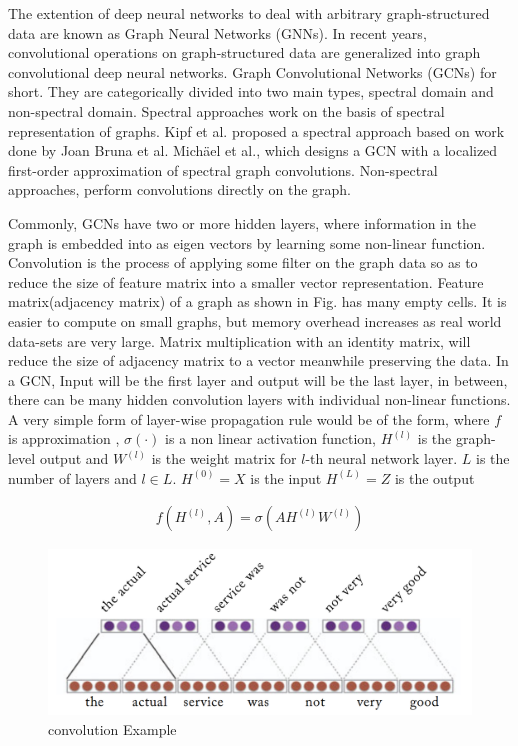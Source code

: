 The extention of deep neural networks to deal with arbitrary graph-structured data are known as Graph Neural Networks (GNNs)\cite{gori2005new,scarselli2008graph}. In recent years, convolutional operations on graph-structured data are generalized into graph convolutional deep neural networks. Graph Convolutional Networks (GCNs) for short\cite{kipf2016semi}. They are categorically divided into two main types, spectral domain and non-spectral domain. Spectral approaches work on the basis of spectral representation of graphs. Kipf et al.\cite{kipf2016semi} proposed a spectral approach based on work done by Joan Bruna et al.\cite{bruna2013spectral} Michäel et al.\cite{defferrard2016convolutional}, which designs a GCN with a localized first-order approximation of spectral graph convolutions. Non-spectral approaches, perform  convolutions directly on the graph.

\newpar
Commonly, GCNs have two or more hidden layers, where information in the graph is embedded into as eigen vectors by learning some non-linear function. Convolution is the process of applying some filter on the graph data so as to reduce the size of feature matrix into a smaller vector representation. Feature matrix(adjacency matrix) of a graph as shown in Fig. has many empty cells. It is easier to compute on small graphs, but memory overhead increases as real world data-sets are very large. Matrix multiplication with an identity matrix, will reduce the size of adjacency matrix to a vector meanwhile preserving the data. In a GCN, Input will be the first layer and output will be the last layer, in between, there can be many hidden convolution layers with individual non-linear functions. A very simple form of layer-wise propagation rule would be of the form\cite{kipf2016semi},  where $f$ is approximation , $\sigma\left(\cdot\right)$ is a non linear activation function, $H^{\left(l\right)}$ is the graph-level output and $W^{\left(l\right)}$ is the weight matrix for $l$-th neural network layer. $L$ is the number of layers and $l \in L$. $H^{\left(0\right)} = X$ is the input $H^{\left(L\right)} = Z$ is the output

\begin{subequations}
	\label{eq2}
	\begin{align}
	\displaystyle f\left(H^{\left(l\right)},A\right) =\sigma \left(AH^{\left(l\right)}W^{\left(l\right)}\right)
	\end{align}
\end{subequations}
\begin{figure}[h!]
	\centering
	\includegraphics[scale=0.15]{figures/convolution.PNG}
	\caption{convolution Example}
	\label{fig:con}
\end{figure}

